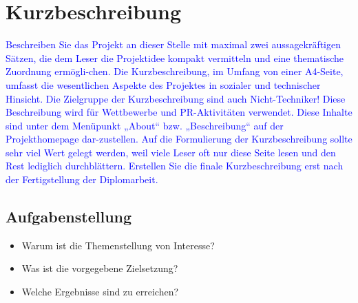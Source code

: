 \documentclass{article}
\newcommand{\todayD}{\the\day.\the\month.\the\year}
\begin{document}



\fancyhf[EFL]{\todayD}
\fancyhf[OFL]{\todayD}


\fancyhf[EFR]{\thepage}
\fancyhf[OFR]{\thepage}


\newpage
\normalsize

\section*{Kurzbeschreibung}
\textcolor{blue}{
Beschreiben Sie das Projekt an dieser Stelle mit maximal zwei aussagekräftigen Sätzen, die dem Leser die Projektidee kompakt vermitteln und eine thematische Zuordnung ermögli-chen.
Die Kurzbeschreibung, im Umfang von einer A4-Seite, umfasst die wesentlichen Aspekte des Projektes in sozialer und technischer Hinsicht. Die Zielgruppe der Kurzbeschreibung sind auch Nicht-Techniker! 
Diese Beschreibung wird für Wettbewerbe und PR-Aktivitäten verwendet. Diese Inhalte sind unter dem Menüpunkt „About“ bzw. „Beschreibung“ auf der Projekthomepage dar-zustellen. Auf die Formulierung der Kurzbeschreibung sollte sehr viel Wert gelegt werden, weil viele Leser oft nur diese Seite lesen und den Rest lediglich durchblättern. Erstellen Sie die finale Kurzbeschreibung erst nach der Fertigstellung der Diplomarbeit.}

\color{blue}
\subsection*{Aufgabenstellung}
\begin{itemize}
    \item Warum ist die Themenstellung von Interesse?
    \item Was ist die vorgegebene Zielsetzung?
    \item Welche Ergebnisse sind zu erreichen?
\end{itemize}
\end{document}
